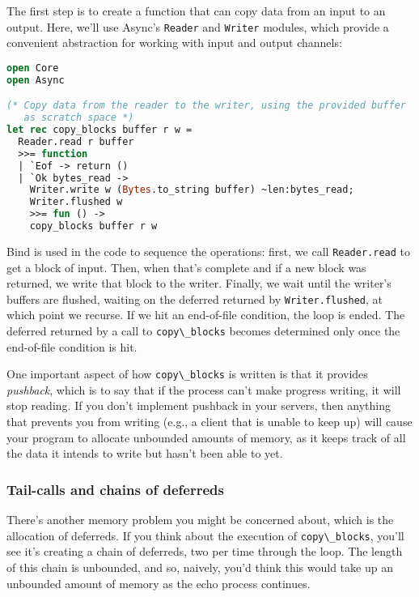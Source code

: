 The first step is to create a function that can copy data from an input
to an output. Here, we'll use Async's \passthrough{\lstinline!Reader!}
and \passthrough{\lstinline!Writer!} modules, which provide a convenient
abstraction for working with input and output channels: 

\begin{lstlisting}[language=Caml]
open Core
open Async

(* Copy data from the reader to the writer, using the provided buffer
   as scratch space *)
let rec copy_blocks buffer r w =
  Reader.read r buffer
  >>= function
  | `Eof -> return ()
  | `Ok bytes_read ->
    Writer.write w (Bytes.to_string buffer) ~len:bytes_read;
    Writer.flushed w
    >>= fun () ->
    copy_blocks buffer r w
\end{lstlisting}

Bind is used in the code to sequence the operations: first, we call
\passthrough{\lstinline!Reader.read!} to get a block of input. Then,
when that's complete and if a new block was returned, we write that
block to the writer. Finally, we wait until the writer's buffers are
flushed, waiting on the deferred returned by
\passthrough{\lstinline!Writer.flushed!}, at which point we recurse. If
we hit an end-of-file condition, the loop is ended. The deferred
returned by a call to \passthrough{\lstinline!copy\_blocks!} becomes
determined only once the end-of-file condition is hit.

One important aspect of how \passthrough{\lstinline!copy\_blocks!} is
written is that it provides \emph{pushback}, which is to say that if the
process can't make progress writing, it will stop reading. If you don't
implement pushback in your servers, then anything that prevents you from
writing (e.g., a client that is unable to keep up) will cause your
program to allocate unbounded amounts of memory, as it keeps track of
all the data it intends to write but hasn't been able to yet.

\hypertarget{tail-calls-and-chains-of-deferreds}{%
\subsubsection{Tail-calls and chains of
deferreds}\label{tail-calls-and-chains-of-deferreds}}

There's another memory problem you might be concerned about, which is
the allocation of deferreds. If you think about the execution of
\passthrough{\lstinline!copy\_blocks!}, you'll see it's creating a chain
of deferreds, two per time through the loop. The length of this chain is
unbounded, and so, naively, you'd think this would take up an unbounded
amount of memory as the echo process continues.

